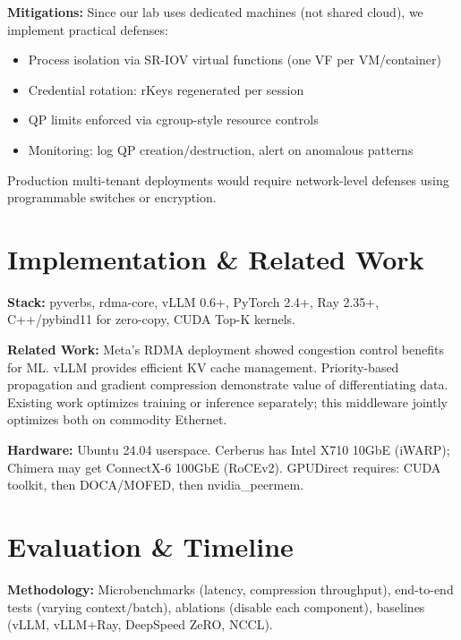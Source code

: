 \documentclass[10pt,letterpaper]{article}
\begin{document}
\textbf{Mitigations:} Since our lab uses dedicated machines (not shared cloud), we implement practical defenses:
\begin{itemize}[nosep]
\item Process isolation via SR-IOV virtual functions (one VF per VM/container)
\item Credential rotation: rKeys regenerated per session
\item QP limits enforced via cgroup-style resource controls
\item Monitoring: log QP creation/destruction, alert on anomalous patterns
\end{itemize}
Production multi-tenant deployments would require network-level defenses using programmable switches \cite{bedrock} or encryption.

\section{Implementation \& Related Work}

\textbf{Stack:} pyverbs, rdma-core, vLLM 0.6+, PyTorch 2.4+, Ray 2.35+, C++/pybind11 for zero-copy, CUDA Top-K kernels.

\textbf{Related Work:} Meta's RDMA deployment \cite{meta-rdma} showed congestion control benefits for ML. vLLM \cite{vllm} provides efficient KV cache management. Priority-based propagation \cite{p3} and gradient compression \cite{powersgd} demonstrate value of differentiating data. Existing work optimizes training \cite{byteps,zero} or inference \cite{distserve} separately; this middleware jointly optimizes both on commodity Ethernet.

\textbf{Hardware:} Ubuntu 24.04 userspace. Cerberus has Intel X710 10GbE (iWARP); Chimera may get ConnectX-6 100GbE (RoCEv2). GPUDirect requires: CUDA toolkit, then DOCA/MOFED, then nvidia\_peermem.

\section{Evaluation \& Timeline}

\textbf{Methodology:} Microbenchmarks (latency, compression throughput), end-to-end tests (varying context/batch), ablations (disable each component), baselines (vLLM, vLLM+Ray, DeepSpeed ZeRO, NCCL).
\end{document}
